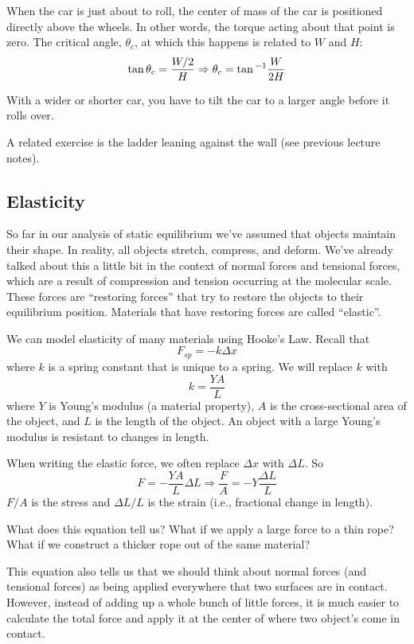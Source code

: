 When the car is just about to roll, the center of mass of the car is positioned directly above the wheels. In other words, the torque acting about that point is zero. The critical angle, $\theta_c$, at which this happens is related to $W$ and $H$:
$$\tan\theta_c=\frac{W/2}{H}\Rightarrow \theta_c=\tan\displaystyle^{-1}\frac{W}{2H}$$

With a wider or shorter car, you have to tilt the car to a larger angle before it rolls over.

A related exercise is the ladder leaning against the wall (see previous lecture notes).


\subsection{Elasticity}
So far in our analysis of static equilibrium we've assumed that objects maintain their shape. In reality, all objects stretch, compress, and deform. We've already talked about this a little bit in the context of normal forces and tensional forces, which are a result of compression and tension occurring at the molecular scale. These forces are ``restoring forces'' that try to restore the objects to their equilibrium position. Materials that have restoring forces are called ``elastic''. 

We can model elasticity of many materials using Hooke's Law. Recall that
$$F_{sp}=-k\Delta{x}$$
where $k$ is a spring constant that is unique to a spring. We will replace $k$ with
$$k=\frac{YA}{L}$$
where $Y$ is Young's modulus (a material property), $A$ is the cross-sectional area of the object, and $L$ is the length of the object. An object with a large Young's modulus is resistant to changes in length.

When writing the elastic force, we often replace $\Delta{x}$ with $\Delta{L}$. So
$$F=-\frac{YA}{L}\Delta{L}\Rightarrow \frac{F}{A}=-Y\frac{\Delta{L}}{L}$$
$F/A$ is the stress and $\Delta{L}/L$ is the strain (i.e., fractional change in length).

What does this equation tell us? What if we apply a large force to a thin rope? What if we construct a thicker rope out of the same material?

This equation also tells us that we should think about normal forces (and tensional forces) as being applied everywhere that two surfaces are in contact. However, instead of adding up a whole bunch of little forces, it is much easier to calculate the total force and apply it at the center of where two object's come in contact.


